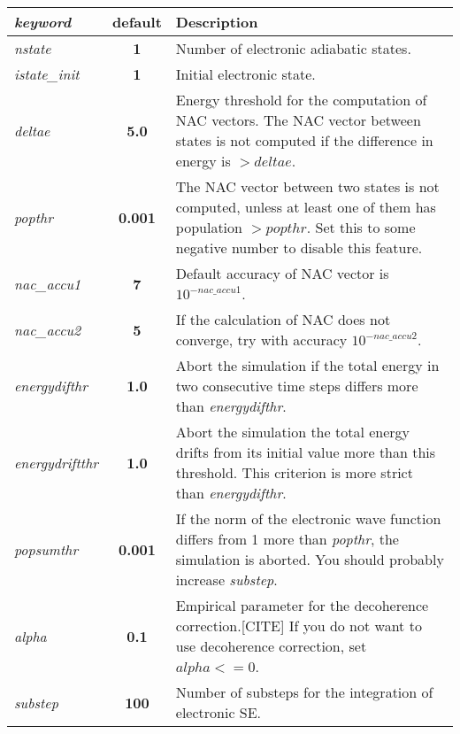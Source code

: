 \documentclass[12pt,a4paper]{article}
\begin{document}
\hspace*{-0.4cm} 
\begin{tabular}{lcp{12cm}}
\textit{keyword} & \textbf{default} & Description \\
\hline
\textit{nstate} & \textbf{1} & Number of electronic adiabatic states.\\
\textit{istate\_init} & \textbf{1} & Initial electronic state. \\ 

\textit{deltae} & \textbf{5.0} & Energy threshold for the computation of NAC vectors.
The NAC vector between states is not computed if the difference in energy is $ > deltae$.\\ 
 
\textit{popthr} & \textbf{0.001} & The NAC vector between two states is not computed,
unless at least one of them has population $ > popthr$. Set this to some negative number to disable this feature. \\

\textit{nac\_accu1} & \textbf{7} & Default accuracy of NAC vector is $10^{-nac\_accu1}$. \\

\textit{nac\_accu2} & \textbf{5} & If the calculation of NAC does not converge, 
try with accuracy $10^{-nac\_accu2}$. \\


\textit{energydifthr} & \textbf{1.0} &  Abort the simulation if the total energy in two consecutive
time steps differs more than \textit{energydifthr}.       \\
 
\textit{energydriftthr} & \textbf{1.0} & Abort the simulation the total energy drifts 
from its initial value more than this threshold. 
This criterion is more strict than \textit{energydifthr}. \\
 
\colorbox{black!20}{\textit{popsumthr}} & \textbf{0.001} & If the norm of the electronic wave function differs from 1
more than \textit{popthr}, the simulation is aborted.
You should probably increase \textit{substep}. \\

\textit{alpha} & \textbf{0.1} & Empirical parameter for the decoherence correction.[CITE]
If you do not want to use decoherence correction, set $alpha <= 0 $. \\
   
\textit{substep} & \textbf{100} & Number of substeps for the integration of electronic SE. \\


\end{tabular}
\end{document}
